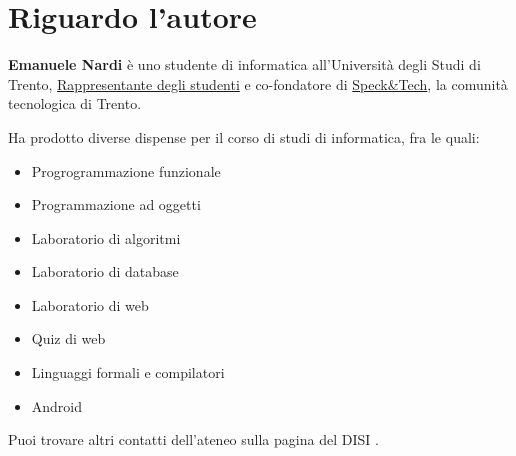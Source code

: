 \section*{Riguardo l'autore}

\textbf{Emanuele Nardi} è uno studente di informatica all'Università degli Studi di Trento, \href{}{Rappresentante degli studenti} e co-fondatore di \href{http://speckand.tech}{Speck\&Tech}, la comunità tecnologica di Trento.

\medskip
Ha prodotto diverse dispense per il corso di studi di informatica, fra le quali:
\begin{itemize}
	\item Progrogrammazione funzionale
	\item Programmazione ad oggetti
	\item Laboratorio di algoritmi
	\item Laboratorio di database
	\item Laboratorio di web
	\item Quiz di web
	\item Linguaggi formali e compilatori
	\item Android
\end{itemize}

\medskip
Puoi trovare altri contatti dell'ateneo sulla pagina del DISI %
\href{http://offertaformativa.unitn.it/it/l/informatica/contatti-e-referenti}{\ExternalLink}.
